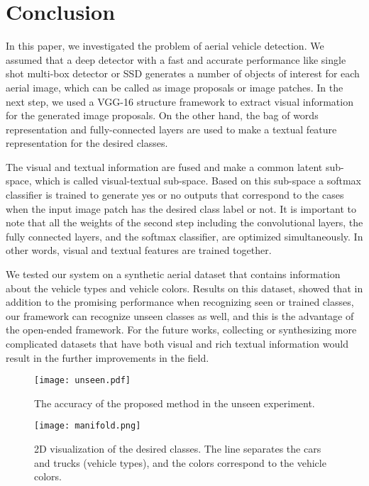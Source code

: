\documentclass[conference]{IEEEtran}
\begin{document}
\section{Conclusion}
In this paper, we investigated the problem of aerial vehicle detection. We assumed that a deep detector with a fast and accurate performance like single shot multi-box detector or SSD generates a number of objects of interest for each aerial image, which can be called as image proposals or image patches. In the next step, we used a VGG-16 structure framework to extract visual information for the generated image proposals. On the other hand, the bag of words representation and fully-connected layers are used to make a textual feature representation for the desired classes. 


The visual and textual information are fused and make a common latent sub-space, which is called visual-textual sub-space. Based on this sub-space a softmax classifier is trained to generate yes or no outputs that correspond to the cases when the input image patch has the desired class label or not. It is important to note that all the weights of the second step including the convolutional layers, the fully connected layers, and the softmax classifier, are optimized simultaneously. In other words, visual and textual features are trained together.


We tested our system on a synthetic aerial dataset that contains information about the vehicle types and vehicle colors. Results on this dataset, showed that in addition to the promising performance when recognizing seen or trained classes, our framework can recognize unseen classes as well, and this is the advantage of the open-ended framework. For the future works, collecting or synthesizing more complicated datasets that have both visual and rich textual information would result in the further improvements in the field. \\

\begin{figure}[!t]
\centering
\texttt{[image: unseen.pdf]}
\caption{The accuracy of the proposed method in the unseen experiment.}
\label{fig_graph5}
\end{figure}

\begin{figure}[t]
\centering
\texttt{[image: manifold.png]}
\caption{2D visualization of the desired classes. The line separates the cars and trucks (vehicle types), and the colors correspond to the vehicle colors.}
\label{fig_graph9}
\end{figure}










\end{document}
